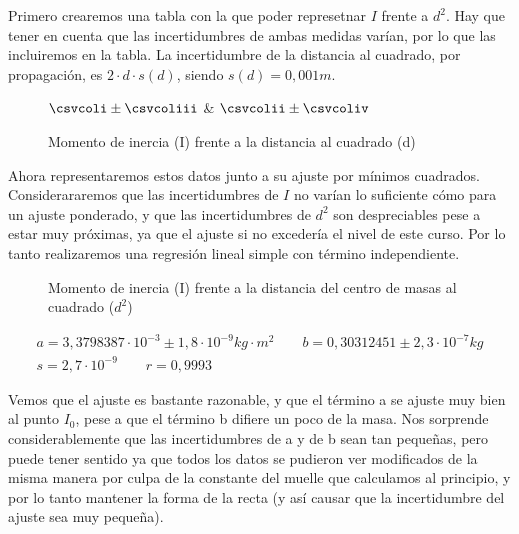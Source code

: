 \documentclass[12pt, a4paper, titlepage]{article}
\begin{document}
  Primero crearemos una tabla con la que poder represetnar $I$ frente a $d^2$. Hay que tener en cuenta que las incertidumbres de ambas medidas varían, por lo que las incluiremos en la tabla. La incertidumbre de la distancia al cuadrado, por propagación, es $2 \cdot d \cdot s(d)$, siendo $s(d) = 0,001m$.

  \begin{figure}[H]
    \begin{table}[H]
      \centering
        {}
        {$\csvcoli \pm \csvcoliii$ & $\csvcolii \pm \csvcoliv$}
    \end{table}
    \caption{Momento de inercia (I) frente a la distancia al cuadrado (d)}
  \end{figure}

  Ahora representaremos estos datos junto a su ajuste por mínimos cuadrados. Considerararemos que las incertidumbres de $I$ no varían lo suficiente cómo para un ajuste ponderado, y que las incertidumbres de $d^2$ son despreciables pese a estar muy próximas, ya que el ajuste si no excedería el nivel de este curso. Por lo tanto realizaremos una regresión lineal simple con término independiente.

  \begin{figure}[H]
    \hspace{3.2em} 
    \caption{Momento de inercia (I) frente a la distancia del centro de masas al cuadrado ($d^2$)}
  \end{figure}
  \begin{gather*}
    a = 3,3798387 \cdot 10^{-3} \pm 1,8 \cdot 10^{-9} kg \cdot m^2 \qquad b = 0,30312451 \pm 2,3 \cdot 10^{-7} kg \\
    s = 2,7 \cdot 10^{-9} \qquad r = 0,9993
  \end{gather*}

  Vemos que el ajuste es bastante razonable, y que el término a se ajuste muy bien al punto $I_0$, pese a que el término b difiere un poco de la masa. Nos sorprende considerablemente que las incertidumbres de a y de b sean tan pequeñas, pero puede tener sentido ya que todos los datos se pudieron ver modificados de la misma manera por culpa de la constante del muelle que calculamos al principio, y por lo tanto mantener la forma de la recta (y así causar que la incertidumbre del ajuste sea muy pequeña).
\end{document}
